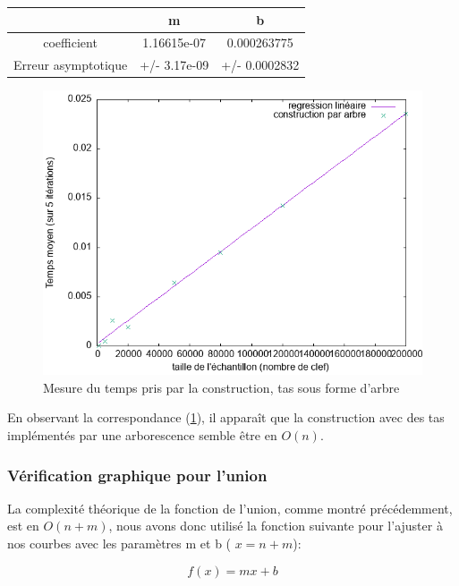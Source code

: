 \documentclass[12pt,a4paper]{article}
\begin{document}
\begin{center}
\begin{tabular}{|c|c|c|}
\hline
 & m & b \\
\hline
coefficient & 1.16615e-07 & 0.000263775 \\
Erreur asymptotique & +/- 3.17e-09 & +/- 0.0002832  \\
\hline
\end{tabular}
\end{center}


\begin{figure}[hbtp]
\centering
\includegraphics[scale=0.4]{../Images/svg courbes pour rapport/cplxt_cons_arbre_regression.png}
\caption{Mesure du temps pris par la construction, tas sous forme d'arbre}
\label{fig4}
\end{figure}

En observant la correspondance (\ref{fig4}), il apparaît que la construction avec des tas implémentés par une arborescence semble être en $O(n)$.




\subsubsection{Vérification graphique pour l'union}

La complexité théorique de la fonction de l'union, comme montré précédemment, est en $O(n + m )$, nous avons donc utilisé la fonction suivante pour l'ajuster à nos courbes avec les paramètres m et b ( $x = n+m $): 

$$
f(x) = mx +b
$$
\end{document}
